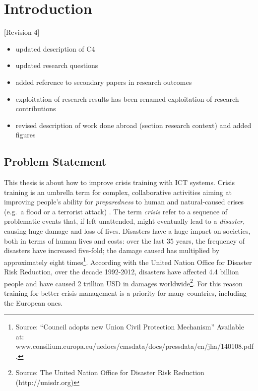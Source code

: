 \mainmatter

\chapter{Introduction}\label{introduction}

{[}Revision 4{]}

\begin{itemize}
\itemsep1pt\parskip0pt
\item
  updated description of C4
\item
  updated research questions
\item
  added reference to secondary papers in research outcomes
\item
  exploitation of research results has been renamed exploitation of
  research contributions
\item
  revised description of work done abroad (section research context) and
  added figures
\end{itemize}

\section{Problem Statement}\label{problem-statement}

\reversemarginpar

This thesis is about how to improve crisis training with ICT systems.
Crisis training is an umbrella term for complex, collaborative
activities aiming at improving people's ability for \emph{preparedness}
to human and natural-caused crises (e.g.~a flood or a terrorist attack)
\autocite{Lagadec:1997js}. The term \emph{crisis} refer to a sequence of
problematic events that, if left unattended, might eventually lead to a
\emph{disaster}, causing huge damage and loss of lives. Disasters have a
huge impact on societies, both in terms of human lives and costs: over
the last 35 years, the frequency of disasters have increased five-fold;
the damage caused has multiplied by approximately eight times\footnote{Source:
  ``Council adopts new Union Civil Protection Mechanism'' Available at:
  www.consilium.europa.eu/uedocs/cmsdata/docs/pressdata/en/jha/140108.pdf.}.
According with the United Nation Office for Disaster Risk Reduction,
over the decade 1992-2012, disasters have affected 4.4 billion people
and have caused 2 trillion USD in damages worldwide\footnote{Source: The
  United Nation Office for Disaster Risk Reduction (http://unisdr.org)}.
For this reason training for better crisis management is a priority for
many countries, including the European ones.

